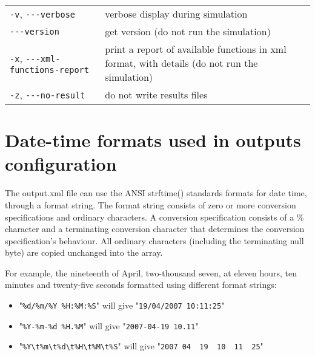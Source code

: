 \begin{center}
\begin{tabularx}{\linewidth}{lX}
\texttt{-v}, \verb?---?\texttt{verbose}&verbose display during simulation\\
\verb?---?\texttt{version}&get version (do not run the simulation)\\
\texttt{-x}, \verb?---?\texttt{xml-functions-report}&print a report of available functions in xml format, with details (do not run the simulation)\\
\texttt{-z}, \verb?---?\texttt{no-result}&do not write results files\\
\end{tabularx}
\end{center}


\section{Date-time formats used in outputs configuration}

The output.xml file can use the ANSI strftime() standards formats for date time, through a format string. 
The format string consists of zero or more conversion specifications and ordinary characters.
A conversion specification consists of a \% character and a terminating conversion character that determines the conversion specification's behaviour.
All ordinary characters (including the terminating null byte) are copied unchanged into the array.

\bigskip

For example, the nineteenth of April, two-thousand seven, at eleven hours, ten minutes and twenty-five seconds formatted using different format strings:
\begin{itemize}
\item "\verb|%d/%m/%Y %H:%M:%S|" will give "\verb|19/04/2007 10:11:25|"
\item "\verb|%Y-%m-%d %H.%M|" will give "\verb|2007-04-19 10.11|"
\item "\verb|%Y\t%m\t%d\t%H\t%M\t%S|" will give "\verb|2007	04	19	10	11	25|"
\end{itemize}

